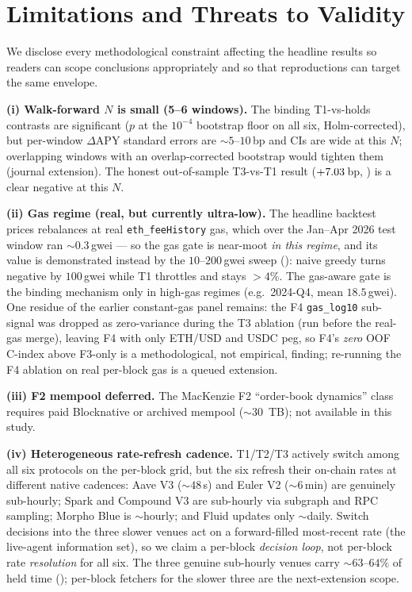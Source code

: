 
\section{Limitations and Threats to Validity}
\label{sec:limitations}

We disclose every methodological constraint affecting the headline
results so readers can scope conclusions appropriately and so that
reproductions can target the same envelope.

\textbf{(i) Walk-forward $N$ is small (5--6 windows).}  The binding
T1-vs-holds contrasts are significant ($p$ at the $10^{-4}$ bootstrap floor on all six,
Holm-corrected), but
per-window $\Delta$APY standard errors are $\sim 5$--$10$\,bp and
CIs are wide at this $N$; overlapping windows with an
overlap-corrected bootstrap would tighten them (journal extension).
The honest out-of-sample T3-vs-T1 result ($+7.03$\,bp,
) is a clear negative at this $N$.

\textbf{(ii) Gas regime (real, but currently ultra-low).}  The
headline backtest prices rebalances at real \texttt{eth\_feeHistory}
gas, which over the Jan--Apr 2026 test window ran $\sim 0.3$\,gwei
--- so the gas gate is near-moot \emph{in this regime}, and its value
is demonstrated instead by the $10$--$200$\,gwei sweep
(): naive greedy turns negative by $100$\,gwei
while T1 throttles and stays $>4\%$. The gas-aware gate is the
binding mechanism only in high-gas regimes (e.g.\ 2024-Q4, mean
$18.5$\,gwei). One residue of the earlier constant-gas panel
remains: the F4 \texttt{gas\_log10} sub-signal was dropped as
zero-variance during the T3 ablation (run before the real-gas
merge), leaving F4 with only ETH/USD and USDC peg, so F4's
\emph{zero} OOF C-index above F3-only is a methodological, not
empirical, finding; re-running the F4 ablation on real per-block gas
is a queued extension.

\textbf{(iii) F2 mempool deferred.}  The MacKenzie F2
``order-book dynamics'' class requires paid Blocknative or
archived mempool ($\sim 30$~TB); not available in this study.

\textbf{(iv) Heterogeneous rate-refresh cadence.}  T1/T2/T3 actively
switch among all six protocols on the per-block grid, but the six
refresh their on-chain rates at different native cadences: Aave V3
($\sim 48$\,s) and Euler V2 ($\sim 6$\,min) are genuinely
sub-hourly; Spark and Compound V3 are sub-hourly via subgraph and
RPC sampling; Morpho Blue is $\sim$hourly; and Fluid updates only
$\sim$daily.  Switch decisions into the three slower venues act on a
forward-filled most-recent rate (the live-agent information set), so
we claim a per-block \emph{decision loop}, not per-block rate
\emph{resolution} for all six.  The three genuine sub-hourly venues
carry $\sim 63$--$64\%$ of held time ();
per-block fetchers for the slower three are the next-extension scope.

